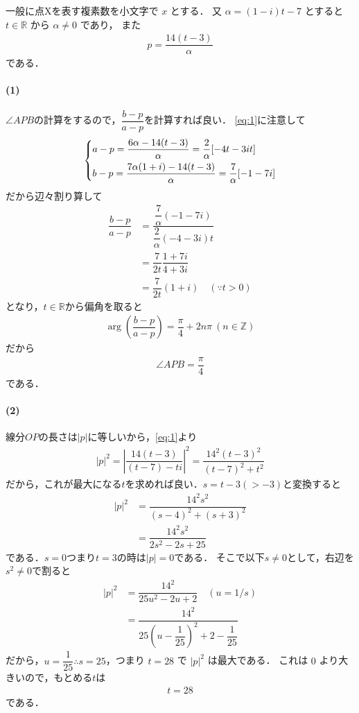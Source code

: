 \documentclass[../../main.tex]{subfiles}
\begin{document}
一般に点Xを表す複素数を小文字で $x$ とする．
又 $\alpha = (1-i)t - 7$ とすると$t \in \mathbb{R}$ から $\alpha \neq 0$ であり，
また
\begin{align}
  p = \dfrac{14(t-3)}{\alpha} \label{eq:1}
\end{align}
である．

\paragraph{(1)}

$\angle APB$の計算をするので，$\dfrac{b-p}{a-p}$を計算すれば良い．
\cref{eq:1}に注意して
\begin{align}
  \begin{dcases}
    a-p = \dfrac{6\alpha - 14(t-3)}{\alpha} = \dfrac{2}{\alpha}[-4t-3it] \\
    b-p = \dfrac{7\alpha(1+i) - 14(t-3)}{\alpha} = \dfrac{7}{\alpha}[-1-7i]
  \end{dcases}
\end{align}
だから辺々割り算して
\begin{align}
  \dfrac{b-p}{a-p}
  &= \dfrac{\dfrac{7}{\alpha}(-1-7i)}{\dfrac{2}{\alpha}(-4-3i)t} \\
  &= \dfrac{7}{2t} \dfrac{1+7i}{4+3i} \\
  &= \dfrac{7}{2t} (1+i) \quad (\because t > 0)
\end{align}
となり，$t\in\mathbb{R}$から偏角を取ると
\begin{align}
  \arg\left(\dfrac{b-p}{a-p}\right) = \dfrac{\pi}{4} + 2n\pi \ (n \in \mathbb{Z})
\end{align}
だから
\begin{align}
  \angle APB = \dfrac{\pi}{4}
\end{align}
である．

\paragraph{(2)}

線分$OP$の長さは$|p|$に等しいから，\cref{eq:1}より
\begin{align}
  |p|^2 = \left|\dfrac{14(t-3)}{(t-7)-ti} \right|^2 = \dfrac{14^2(t-3)^2}{(t-7)^2+t^2}
\end{align}
だから，これが最大になる$t$を求めれば良い．$s=t-3 (> -3)$と変換すると
\begin{align}
  |p|^2
  &= \dfrac{14^2s^2}{(s-4)^2+(s+3)^2} \\
  &= \dfrac{14^2s^2}{2s^2-2s+25}
\end{align}
である．$s=0$つまり$t=3$の時は$|p|=0$である．
そこで以下$s\neq 0$として，右辺を$s^2 \neq 0$で割ると
\begin{align}
  |p|^2
  &=\dfrac{14^2}{25u^2-2u+2} \quad (u = 1/s) \\
  &= \dfrac{14^2}{25\left(u-\dfrac{1}{25}\right)^2 + 2 - \dfrac{1}{25}}
\end{align}
だから，$u = \dfrac{1}{25} \therefore s=25$，つまり $t=28$ で $|p|^2$ は最大である．
これは $0$ より大きいので，もとめる$t$は
\begin{align}
  t = 28
\end{align}
である．
\end{document}
